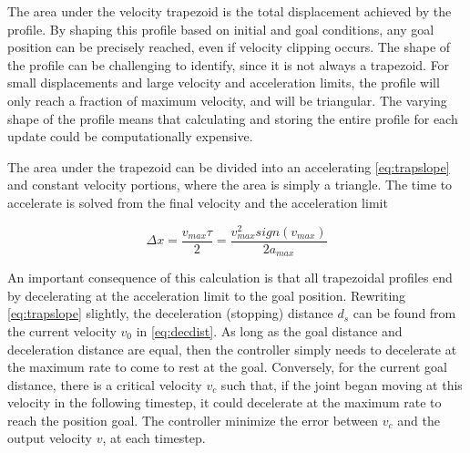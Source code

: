 
The area under the velocity trapezoid is the total displacement achieved by the
profile. By shaping this profile based on initial and goal conditions, any
goal position can be precisely reached, even if velocity clipping occurs. The
shape of the profile can be challenging to identify, since it is not
always a trapezoid. For small displacements and large velocity and acceleration
limits, the profile will only reach a fraction of maximum velocity, and will be
triangular. The varying shape of the profile means that calculating and storing
the entire profile for each update could be computationally expensive. 

The area under the trapezoid can be divided into an accelerating
\eqref{eq:trapslope} and constant velocity portions, where the area is simply a
triangle. The time to accelerate is solved from the final velocity and the
acceleration limit

\begin{equation}
\label{eq:trapslope}
\Delta x=\frac{v_{max}\tau}{2}=\frac{v_{max}^2 sign(v_{max})}{2a_{max}}
\end{equation}

An important consequence of this calculation is that all trapezoidal profiles
end by decelerating at the acceleration limit to the goal position. Rewriting
\eqref{eq:trapslope} slightly, the deceleration (stopping) distance $d_s$ can be found
from the current velocity $v_0$ in \eqref{eq:decdist}. As long as the goal
distance and deceleration distance are equal, then the controller simply
needs to decelerate at the maximum rate to come to rest at the goal.
Conversely, for the current goal distance, there is a critical velocity $v_c$
such that, if the joint began moving at this velocity in the following
timestep, it could decelerate at the maximum rate to reach the position goal.
The controller minimize the error between $v_c$ and the output velocity $v$,
at each timestep.

